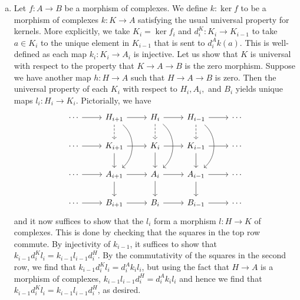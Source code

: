 \documentclass{../mathnotes}
\begin{document}
\begin{enumerate}[(a)]
    \item Let $f:A\to B$ be a morphism of complexes. We define $k:\ker f$ to be a morphism of complexes
        $k:K\to A$ satisfying the usual universal property for kernels. More explicitly, we take
        $K_i=\ker f_i$ and $d_i^K:K_i\to K_{i-1}$ to take $a\in K_i$ to the unique element in $K_{i-1}$
        that is sent to $d_i^Ak(a)$. This is well-defined as each map $k_i:K_i\to A_i$ is injective.
        Let us show that $K$ is universal with respect to the property that $K\to A\to B$ is the zero
        morphism. Suppose we have another map $h:H\to A$ such that $H\to A\to B$ is zero. Then the
        universal property of each $K_i$ with respect to $H_i,A_i,$ and $B_i$ yields unique maps
        $l_i:H_i\to K_i$. Pictorially, we have
        \begin{equation*}
            \begin{tikzcd}
                \cdots\ar{r} & H_{i+1}\ar{r}\ar[dashed]{d}\ar[bend left = 50]{dd} & H_i\ar{r}\ar[dashed]{d}\ar[bend left = 50]{dd} & H_{i-1}\ar{r}\ar[dashed]{d}\ar[bend left = 50]{dd} & \cdots\\
                \cdots\ar{r} & K_{i+1}\ar{r}\ar{d} & K_i\ar{r}\ar{d} & K_{i-1}\ar{r}\ar{d} & \cdots\\
                \cdots\ar{r} & A_{i+1}\ar{r}\ar{d} & A_i\ar{r}\ar{d} & A_{i-1}\ar{r}\ar{d} & \cdots\\
                \cdots\ar{r} & B_{i+1}\ar{r} & B_i\ar{r} & B_{i-1}\ar{r} & \cdots
            \end{tikzcd}
        \end{equation*}
        and it now suffices to show that the $l_i$ form a morphism $l:H\to K$ of complexes. This
        is done by checking that the squares in the top row commute. By injectivity of $k_{i-1}$,
        it suffices to show that $k_{i-1}d_i^Kl_i=k_{i-1}l_{i-1}d_i^H$. By the commutativity of the 
        squares in the second row, we find that $k_{i-1}d_i^Kl_i=d_i^Ak_il_i$, but using the fact that
        $H\to A$ is a morphism of complexes, $k_{i-1}l_{i-1}d_i^H=d_i^Ak_il_i$ and hence we find that
        $k_{i-1}d_i^Kl_i=k_{i-1}l_{i-1}d_i^H$, as desired.


\end{enumerate}
\end{document}
